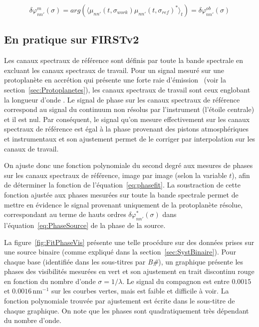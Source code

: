 \begin{equation}
	\delta\varphi^{m}_{nn'}(\sigma) = arg \left ( \langle \mu_{nn'}(t, \sigma_{work}) \mu_{nn'}(t, \sigma_{ref})^* \rangle_t \right ) = \delta\varphi^{ob}_{nn'}(\sigma)
\end{equation}


\subsection{En pratique sur FIRSTv2}
\label{sec:PhaseDiffFIRSTv2}

Les canaux spectraux de référence sont définis par toute la bande spectrale en excluant les canaux spectraux de travail. Pour un signal mesuré sur une protoplanète en accrétion qui présente une forte raie d'émission \ha~(voir la section~\ref{sec:Protoplanetes}), les canaux spectraux de travail sont ceux englobant la longueur d'onde \ha. Le signal de phase sur les canaux spectraux de référence correspond au signal du continuum non résolus par l'instrument (l'étoile centrale) et il est nul. Par conséquent, le signal qu'on mesure effectivement sur les canaux spectraux de référence est égal à la phase provenant des pistons atmosphériques et instrumentaux et son ajustement permet de le corriger par interpolation sur les canaux de travail.

On ajuste donc une fonction polynomiale du second degré aux mesures de phases sur les canaux spectraux de référence, image par image (selon la variable $t$), afin de déterminer la fonction de l'équation~\ref{eq:phasefit}. La soustraction de cette fonction ajustée aux phases mesurées sur toute la bande spectrale permet de mettre en évidence le signal provenant uniquement de la protoplanète résolue, correspondant au terme de hauts ordres $\delta\varphi^{*}_{nn'}(\sigma)$ dans l'équation~\ref{eq:PhaseSource} de la phase de la source.

La figure~\ref{fig:FitPhaseVis} présente une telle procédure sur des données prises sur une source binaire (comme expliqué dans la section~\ref{sec:SystBinaire}). Pour chaque base (identifiée dans les sous-titres par \textit{B\#}), un graphique présente les phases des visibilités mesurées en vert et son ajustement en trait discontinu rouge en fonction du nombre d'onde $\sigma = 1/ \lambda$. Le signal du compagnon est entre $0.0015$ et $0.0016 \, \text{nm}^{-1}$ sur les courbes vertes, mais est faible et difficile à voir. La fonction polynomiale trouvée par ajustement est écrite dans le sous-titre de chaque graphique. On note que les phases sont quadratiquement très dépendant du nombre d'onde.

